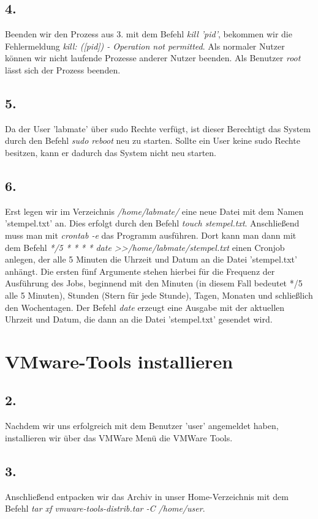 \documentclass[
    fontsize=10pt,
    headings=medium,
    parskip=half,           %
    bibliography=totoc,
    numbers=noenddot,       %
    open=any,               %
    a4paper,
    ]{scrreprt}
\begin{document}
\subsection*{4.}
Beenden wir den Prozess aus 3. mit dem Befehl \emph{kill 'pid'}, bekommen wir die Fehlermeldung \emph{kill: ([pid]) - Operation not permitted}. Als normaler Nutzer können wir nicht laufende Prozesse anderer Nutzer beenden. Als Benutzer \emph{root} lässt sich der Prozess beenden.

\subsection*{5.}
Da der User 'labmate' über sudo Rechte verfügt, ist dieser Berechtigt das System durch den Befehl \emph{sudo reboot} neu zu starten. Sollte ein User keine sudo Rechte besitzen, kann er dadurch das System nicht neu starten.

\subsection*{6.}
Erst legen wir im Verzeichnis \emph{/home/labmate/} eine neue Datei mit dem Namen 'stempel.txt' an. Dies erfolgt durch den Befehl \emph{touch stempel.txt}. Anschließend muss man mit \emph{crontab -e} das Programm ausführen. Dort kann man dann mit dem Befehl \emph{*/5 * * * * date \textgreater\textgreater /home/labmate/stempel.txt} einen Cronjob anlegen, der alle 5 Minuten die Uhrzeit und Datum an die Datei 'stempel.txt' anhängt. Die ersten fünf Argumente stehen hierbei für die Frequenz der Ausführung des Jobs, beginnend mit den Minuten (in diesem Fall bedeutet */5 alle 5 Minuten), Stunden (Stern für jede Stunde), Tagen, Monaten und schließlich den Wochentagen. Der Befehl \emph{date} erzeugt eine Ausgabe mit der aktuellen Uhrzeit und Datum, die dann an die Datei 'stempel.txt' gesendet wird.

\section{VMware-Tools installieren}

\subsection*{2.}
Nachdem wir uns erfolgreich mit dem Benutzer 'user' angemeldet haben, installieren wir über das VMWare Menü die VMWare Tools.

\subsection*{3.}
Anschließend entpacken wir das Archiv in unser Home-Verzeichnis mit dem Befehl \emph{tar xf vmware-tools-distrib.tar -C /home/user}. 
\end{document}
